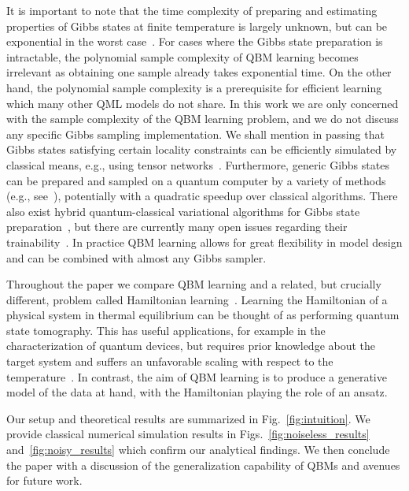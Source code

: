 \documentclass[
    reprint,
    aps,
    prx,
    longbibliography
]{revtex4-2}
\begin{document}
It is important to note that the time complexity of preparing and estimating properties of Gibbs states at finite temperature is largely unknown, but can be exponential in the worst case~\cite{Bravyi_2022}. For cases where the Gibbs state preparation is intractable, the polynomial sample complexity of QBM learning becomes irrelevant as obtaining one sample already takes exponential time. On the other hand, the polynomial sample complexity is a prerequisite for efficient learning which many other QML models do not share. In this work we are only concerned with the sample complexity of the QBM learning problem, and we do not discuss any specific Gibbs sampling implementation. We shall mention in passing that Gibbs states satisfying certain locality constraints can be efficiently simulated by classical means, e.g., using tensor networks~\cite{Alhambra_2021,Kuwahara2021}. Furthermore, generic Gibbs states can be prepared and sampled on a quantum computer by a variety of methods (e.g., see~\cite{Poulin_2009, Temme_2011, kastoryano2016quantum, Chowdhury_2016, anschuetz2019realizing, Holmes_2022, chifang2023quantum, zhang2023dissipative, Coopmans_2023}), potentially with a quadratic speedup over classical algorithms. There also exist hybrid quantum-classical variational algorithms for Gibbs state preparation~\cite{Wu_2019, chowdhury2020variational, Liu_2021, zhao2018bias, consiglio2023variational, huijgen2023training}, but there are currently many open issues regarding their trainability~\cite{McClean_2018, Cerezo_2021, Anschuetz_2022, rudolph2023trainability}. In practice QBM learning allows for great flexibility in model design and can be combined with almost any Gibbs sampler.

Throughout the paper we compare QBM learning and a related, but crucially different, problem called Hamiltonian learning~\cite{Wiebe_2014, franca2020, Anshu_2021, Haah_2024, Rouze_2023, Onorati_2023}. Learning the Hamiltonian of a physical system in thermal equilibrium can be thought of as performing quantum state tomography. This has useful applications, for example in the characterization of quantum devices, but requires prior knowledge about the target system and suffers an unfavorable scaling with respect to the temperature~\cite{Anshu_2021}. In contrast, the aim of QBM learning is to produce a generative model of the data at hand, with the Hamiltonian playing the role of an ansatz.

Our setup and theoretical results are summarized in Fig.~\ref{fig:intuition}. We provide classical numerical simulation results in Figs.~\ref{fig:noiseless_results} and~\ref{fig:noisy_results} which confirm our analytical findings. We then conclude the paper with a discussion of the generalization capability of QBMs and avenues for future work.
\end{document}
